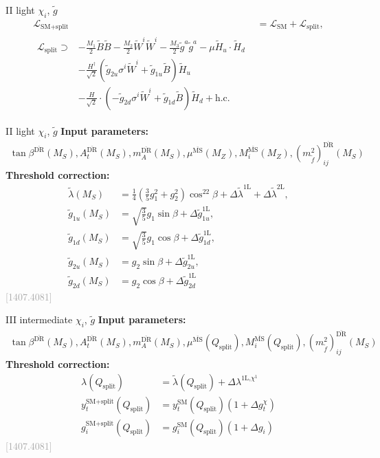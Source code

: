 \documentclass[hyperref={pdfpagelabels=false},ngerman]{beamer}
\newcommand{\MS}{\ensuremath{M_S}}
\newcommand{\bigcite}[1]{\textcolor{darkgray}{[#1]}}
\renewcommand{\emph}{\textbf}
\newcommand{\DRbar}{\ensuremath{\overline{\text{DR}}}}
\newcommand{\MSbar}{\ensuremath{\overline{\text{MS}}}}
\newcommand{\SM}{\ensuremath{\text{SM}}}
\newcommand{\SplitMSSM}{\ensuremath{\text{SM+split}}\xspace}
\newcommand{\hc}{\ensuremath{\text{h.c.}}}
\newcommand{\Qsplit}{\ensuremath{Q_\text{split}}\xspace}
\newcommand{\Lag}{\ensuremath{\mathcal{L}}}
\newcommand{\DlSplitMSSM}[1]{\ensuremath{\Delta\tilde{\lambda}^{\text{#1L}}}}
\newcommand{\gSplitMSSM}[1]{\ensuremath{\tilde{g}_{#1}}}
\newcommand{\DgSplitMSSM}[1]{\ensuremath{\Delta\tilde{g}_{#1}^{\text{1L}}}}
\begin{document}
\begin{frame}{II light $\chi_i$, $\tilde{g}$}
\begin{align*}
  \Lag_{\SplitMSSM} &= \Lag_{\SM} + \Lag_\text{split}, \\
\begin{split}
  \Lag_\text{split} \supset
  &- \frac{M_1}{2} \tilde{B}\tilde{B}
  - \frac{M_2}{2} \tilde{W}^i\tilde{W}^i
  - \frac{M_3}{2} \tilde{g}^a\tilde{g}^a
  - \mu \tilde{H}_u\cdot \tilde{H}_d \\
  &-\frac{H^\dagger}{\sqrt{2}} \left(
    \gSplitMSSM{2u} \sigma^i\tilde{W}^i + \gSplitMSSM{1u} \tilde{B}
  \right)\tilde{H}_u \\
  &-\frac{H}{\sqrt{2}} \cdot  \left(
    -\gSplitMSSM{2d} \sigma^i\tilde{W}^i + \gSplitMSSM{1d} \tilde{B}
  \right) \tilde{H}_d
  + \hc
\end{split}
\end{align*}
\end{frame}

\begin{frame}{II light $\chi_i$, $\tilde{g}$}
  \emph{Input parameters:}
  \begin{align*}
    \tan\beta^{\DRbar}(\MS), A_t^{\DRbar}(\MS), m_A^{\DRbar}(\MS),
    \mu^{\MSbar}(M_Z), M_i^{\MSbar}(M_Z),
    (m_{\tilde{f}}^2)^{\DRbar}_{ij}(\MS)
  \end{align*}
  \emph{Threshold correction:}
  \begin{align*}
    \tilde\lambda(\MS) &= \frac{1}{4}\left(\frac{3}{5} g_1^2 + g_2^2\right)
    \cos^22\beta + \DlSplitMSSM{1} + \DlSplitMSSM{2} ,\\
    \gSplitMSSM{1u}(\MS) &= \sqrt{\frac{3}{5}} g_1 \sin\beta + \DgSplitMSSM{1u},\\
    \gSplitMSSM{1d}(\MS) &= \sqrt{\frac{3}{5}} g_1 \cos\beta + \DgSplitMSSM{1d},\\
    \gSplitMSSM{2u}(\MS) &= g_2 \sin\beta + \DgSplitMSSM{2u},\\
    \gSplitMSSM{2d}(\MS) &= g_2 \cos\beta + \DgSplitMSSM{2d}
  \end{align*}
  \hfill\bigcite{1407.4081}
\end{frame}

\begin{frame}{III intermediate  $\chi_i$, $\tilde{g}$}
  \emph{Input parameters:}
  \begin{align*}
  \tan\beta^{\DRbar}(\MS), A_t^{\DRbar}(\MS), m_A^{\DRbar}(\MS),
  \mu^{\MSbar}(\Qsplit), M_i^{\MSbar}(\Qsplit),
  (m_{\tilde{f}}^2)^{\DRbar}_{ij}(\MS)
  \end{align*}
  \emph{Threshold correction:}
  \begin{align*}
  \lambda(\Qsplit) &= \tilde\lambda(\Qsplit) + \Delta\lambda^{\text{1L,}\chi^1} \\
  y_t^\SplitMSSM(\Qsplit) &= y_t^\SM(\Qsplit) (1 + \Delta g_t^\chi) \\
  g_i^\SplitMSSM(\Qsplit) &= g_i^\SM(\Qsplit) (1 + \Delta g_i)
  \end{align*}
  \hfill\bigcite{1407.4081}
\end{frame}
\end{document}
